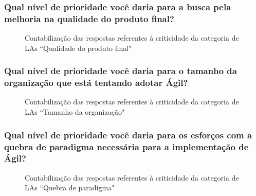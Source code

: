 \subsubsection{Qual nível de prioridade você daria para a busca pela melhoria na qualidade do produto final?}

\begin{figure}[H]
	\centering
	\captionsetup{justification=centering}
	\caption{Contabilização das respostas referentes à criticidade da categoria de LAs ``Qualidade do produto final"}
	\label{fig:result-qualidade}
\end{figure}

\subsubsection{Qual nível de prioridade você daria para o tamanho da organização que está tentando adotar Ágil?}

\begin{figure}[H]
	\centering
	\captionsetup{justification=centering}
	\caption{Contabilização das respostas referentes à criticidade da categoria de LAs ``Tamanho da organização"}
	\label{fig:result-tamanho}
\end{figure}

\subsubsection{Qual nível de prioridade você daria para os esforços com a quebra de paradigma necessária para a implementação de Ágil?}

\begin{figure}[H]
	\centering
	\captionsetup{justification=centering}
	\caption{Contabilização das respostas referentes à criticidade da categoria de LAs ``Quebra de paradigma"}
	\label{fig:result-paradigma}
\end{figure}

